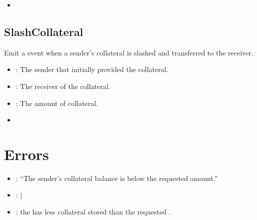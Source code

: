 \documentclass[a4paper,10pt,english]{sphinxmanual}
\begin{document}
\begin{itemize}
\item {} 
{\hyperref[\detokenize{spec/collateral:releasecollateral}]{}}

\end{itemize}


\subsection{SlashCollateral}
\label{\detokenize{spec/collateral:id12}}
Emit a  event when a sender’s collateral is slashed and transferred to the receiver.



\begin{itemize}
\item {} 
: The sender that initially provided the collateral.

\item {} 
: The receiver of the collateral.

\item {} 
: The amount of collateral.

\end{itemize}

\begin{itemize}
\item {} 
{\hyperref[\detokenize{spec/collateral:slashcollateral}]{}}

\end{itemize}


\section{Errors}
\label{\detokenize{spec/collateral:errors}}
\begin{itemize}
\item {} 
: “The sender’s collateral balance is below the requested amount.”

\item {} 
: {\hyperref[\detokenize{spec/collateral:releasecollateral}]{}} | {\hyperref[\detokenize{spec/collateral:slashcollateral}]{}}

\item {} 
: the  has less collateral stored than the requested .

\end{itemize}
\end{document}
